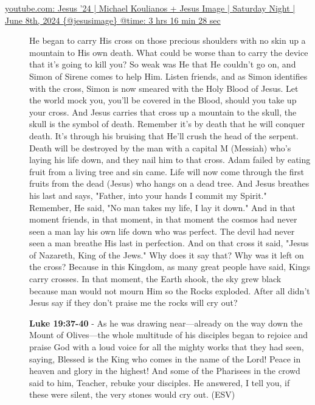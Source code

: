 \documentclass[11pt]{article}
\begin{document}
\begin{description}
\item[{\href{https://youtube.com/watch?v=mLSCu4pKmu4\&t=11788}{youtube.com: Jesus '24 | Michael Koulianos + Jesus Image | Saturday Night | June 8th, 2024 \{@jesusimage\} @time: 3 hrs 16 min 28 sec}}] He began to carry His cross on
those precious shoulders with no
skin up a mountain to His own death. What
could be worse than to carry the device
that it's going to kill
you? So weak was He that He couldn't go
on, and Simon of Sirene comes to help
Him. Listen friends, and as Simon
identifies with the cross, Simon is now smeared with the Holy
Blood of Jesus. Let the world mock you,
you'll be covered in the Blood,
should you take up your cross.
And Jesus carries that cross up a
mountain to the skull, the skull is the symbol of death.
Remember it's by death that he will
conquer death. It's through his bruising
that He'll crush the head of the serpent.
Death will be destroyed by the man with a capital
M (Messiah) who's laying his life
down, and they nail him to that cross.
Adam failed by eating fruit from a
living tree and sin came. Life will now
come through the first fruits
from the dead (Jesus) who hangs on a dead
tree. And Jesus breathes his last and says,
"Father, into your hands I commit my
Spirit." Remember, He said, "No man takes my
life, I lay it down." And in that moment
friends, in that
moment, in that moment the cosmos had
never seen a man lay his own life down
who was perfect. The devil had never seen a man
breathe His last in perfection. And on that cross it
said, "Jesus of Nazareth, King of the
Jews." Why does it say that? Why was it left on the
cross? Because in this Kingdom, as many great people have said,
Kings carry crosses. In that
moment, the Earth shook, the sky grew black because man
would not mourn Him so the Rocks
exploded. After all didn't Jesus say if they
don't praise me the rocks will cry
out?

\textbf{Luke 19:37-40} - As he was drawing near—already on the way down the Mount of Olives—the whole multitude of his disciples began to rejoice and praise God with a loud voice for all the mighty works that they had seen, saying, Blessed is the King who comes in the name of the Lord! Peace in heaven and glory in the highest! And some of the Pharisees in the crowd said to him, Teacher, rebuke your disciples. He answered, I tell you, if these were silent, the very stones would cry out. (ESV)


\end{description}
\end{document}
